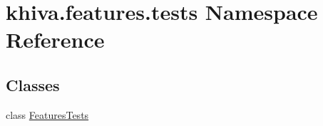 \hypertarget{namespacekhiva_1_1features_1_1tests}{}\section{khiva.\+features.\+tests Namespace Reference}
\label{namespacekhiva_1_1features_1_1tests}
\subsection*{Classes}
\begin{DoxyCompactItemize}
\item 
class \mbox{\hyperlink{classkhiva_1_1features_1_1tests_1_1_features_tests}{Features\+Tests}}
\end{DoxyCompactItemize}
